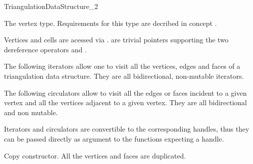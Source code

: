 \begin{ccRefConcept}{TriangulationDataStructure_2}
\ccTypes
{}
\ccThreeToTwo

 { The vertex type. Requirements for this type
are decribed in concept 
.}
\ccGlue
{}

Vertices and cells are acessed  via .
 are trivial pointers supporting
the two dereference operators  and .

\ccGlue
{}




The following iterators allow one to visit all the vertices, edges
and  faces
of a triangulation data structure. They are all
bidirectional, non-mutable iterators.

\ccGlue
{}
\ccGlue
{}


The following circulators allow to visit all the edges or faces
incident to a given vertex and all the vertices
adjacent to a given vertex.  They are all bidirectional and non
mutable.

\ccGlue
{}
\ccGlue
{}
 
Iterators and circulators are convertible to the corresponding handles, thus
they can be passed directly as argument
to the functions expecting a handle.




\ccCreation
{}  %
\ccThreeToTwo


{Copy constructor. All the vertices and faces are duplicated.}


\end{ccRefConcept}
